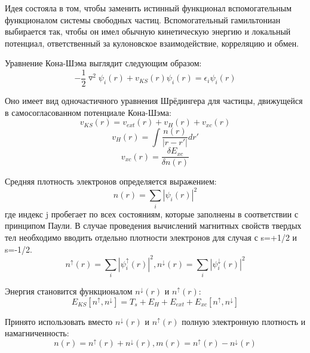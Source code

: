 	Идея состояла в том, чтобы заменить истинный функционал вспомогательным функционалом системы свободных частиц. Вспомогательный гамильтониан выбирается так, чтобы он имел обычную кинетическую энергию и локальный потенциал, ответственный за кулоновское взаимодействие, корреляцию и обмен. 
	
	Уравнение Кона-Шэма выглядит следующим образом:
 	\begin{equation}
  \label{eq:equation1}
 -\frac{1}{2}\triangledown^2\psi_i(r)+v_{KS}(r)\psi_i(r)=\epsilon_i\psi_i(r)
\end{equation}

Оно имеет вид одночастичного уравнения Шрёдингера для частицы, движущейся в самосогласованном потенциале Кона-Шэма:
		 	\begin{equation}
  \label{eq:equation2}
 v_{KS}(r)=v_{ext}(r)+v_H(r)+v_{xc}(r)
\end{equation}
 	\begin{equation}
  \label{eq:equation3}
v_H(r)=\int\frac{n(r)}{|r-r'|}dr'
\end{equation}
 	\begin{equation}
  \label{eq:equation4}
v_{xc}(r)=\frac{\delta E_{xc}}{\delta n(r)}
\end{equation}

Средняя плотность электронов определяется выражением:
 	\begin{equation}
  \label{eq:equation5}
n(r)=\sum_i|\psi_i(r)|^2
\end{equation}
где индекс j пробегает по всех состояниям, которые заполнены в соответствии с принципом Паули.
В случае проведения вычислений магнитных свойств твердых тел необходимо вводить отдельно плотности электронов для случая с s=+1/2 и s=-1/2.
 	\begin{equation}
  \label{eq:equation6}
n^\uparrow(r)=\sum_i|\psi^\uparrow_i(r)|^2, n^\downarrow(r)=\sum_i|\psi^\downarrow_i(r)|^2
\end{equation}

Энергия становится функционалом ${n^\downarrow(r)}$ и ${n^\uparrow(r)}$:
 	\begin{equation}
  \label{eq:equation7}
E_{KS}[n^\uparrow,n^\downarrow]=T_s+E_H+E_{ext}+E_{xc}[n^\uparrow,n^\downarrow]
\end{equation}
	
	Принято использовать вместо ${n^\downarrow(r)}$ и ${n^\uparrow(r)}$ полную электронную плотность и намагниченность:
 	\begin{equation}
  \label{eq:equation8}
n(r)=n^\uparrow(r)+n^\downarrow(r), m(r)=n^\uparrow(r)-n^\downarrow(r)
\end{equation}
	
